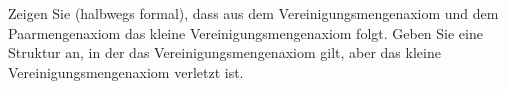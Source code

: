 
\begin{exercise}[258]

Zeigen Sie (halbwegs formal), dass aus dem Vereinigungsmengenaxiom und dem
Paarmengenaxiom das kleine Vereinigungsmengenaxiom folgt. Geben Sie eine Struktur
an, in der das Vereinigungsmengenaxiom gilt, aber das kleine Vereinigungsmengenaxiom
verletzt ist.

\end{exercise}


\begin{solution}

\phantom{}

\end{solution}
